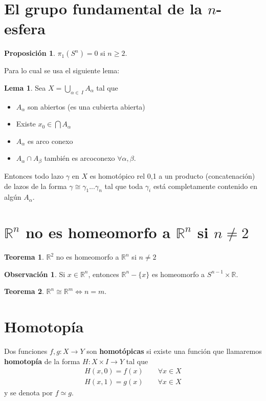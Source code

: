 \documentclass[spanish]{book}
\theoremstyle{definition}
\newtheorem*{lema}{Lema}
\newtheorem*{obs}{Observación}
\newtheorem*{teo}{Teorema}
\newtheorem*{prop}{Proposición}
\newcommand{\R}{\mathbb{R}}
\begin{document}
\section{El grupo fundamental de la $n$-esfera}
	\begin{prop}
		$\pi_1(S^n)=0$ si $n\geq2$.
	\end{prop}
	Para lo cual se usa el siguiente lema:
	\begin{lema}
		Sea $X=\bigcup_{\alpha\in\ I} A_\alpha$ tal que
		\begin{itemize}
			\item $A_\alpha$ son abiertos (es una cubierta abierta)
			\item Existe $x_0\in\bigcap A_\alpha$
			\item $A_\alpha$ es arco conexo
			\item $A_\alpha\cap A_\beta$ también es arcoconexo $\forall\alpha,\beta$.
		\end{itemize}
		Entonces  todo lazo $\gamma$ en $X$ es homotópico rel 0,1 a un producto (concatenación) de lazos de la forma $\gamma\cong\gamma_1...\gamma_n$
		tal que toda $\gamma_i$ está completamente contenido en algún $A_\alpha$.
	\end{lema}

\section{$\R^n$ no es homeomorfo a $\R^n$ si $n\neq2$}
	\begin{teo}
		$\R^2$ no es homeomorfo a $\R^n$ si $n\neq2$
	\end{teo}
	\begin{obs}
		Si $x\in\R^n$, entonces $\R^n-\{x\}$ es homeomorfo a $S^{n-1}\times\R$.
	\end{obs}
	\begin{teo}
		$\R^n\cong\R^m\iff n=m$.
	\end{teo}

\section{Homotopía}
\label{def:func-homot}
	Dos funciones $f,g:X\to Y$ son \textbf{homotópicas} si existe una función que llamaremos \textbf{homotopía} de la forma $H:X\times I\to Y$ tal que
	\begin{align*}
		H(x,0)=f(x)\qquad\forall x\in X\\
		H(x,1)=g(x)\qquad\forall x\in X
	\end{align*}
	y se denota por $f\simeq g$.
	
\end{document}
